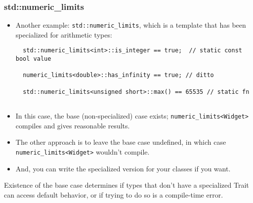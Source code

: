 \begin{frame}[fragile,t]
\frametitle{std::numeric\_limits}
\begin{itemize}[<+->]
\item Another example: \texttt{std::numeric\_limits}, which is a
  template that has been specialized for arithmetic types:
{\scriptsize\begin{verbatim}
  std::numeric_limits<int>::is_integer == true;  // static const bool value

  numeric_limits<double>::has_infinity == true; // ditto
  
  std::numeric_limits<unsigned short>::max() == 65535 // static fn
  
\end{verbatim}
}

\item In this case, the base (non-specialized) case exists;
  \texttt{numeric\_limits<Widget>} compiles and gives reasonable results.
\item The other approach is to leave the base case undefined, in which
  case \texttt{numeric\_limits<Widget>} wouldn't compile.
\item And, you can write the specialized version for your classes if
  you want.
\end{itemize}
\pause
\begin{center}
Existence of the base case determines if types that don't have a
specialized Trait can access default behavior, or if trying to do so
is a compile-time error.
\end{center}


\end{frame}
